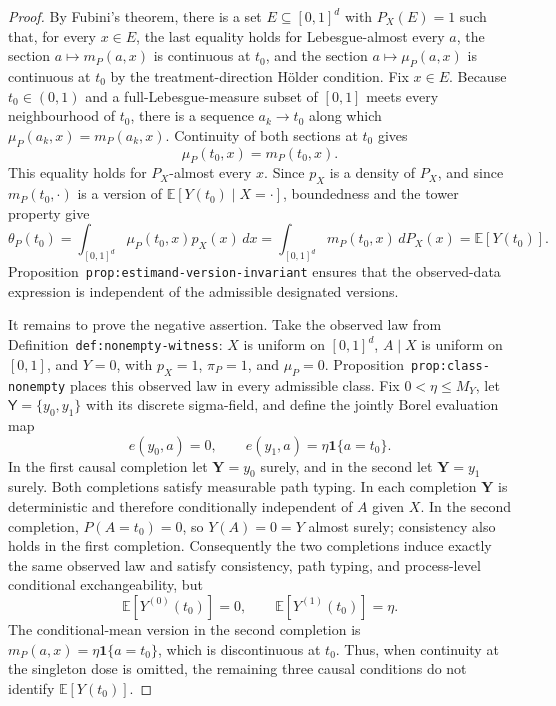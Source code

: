\documentclass{article}
\begin{document}
\begin{proof}
By Fubini's theorem, there is a set \(E\subseteq[0,1]^d\) with \(P_X(E)=1\) such that, for every \(x\in E\), the last equality holds for Lebesgue-almost every \(a\), the section \(a\mapsto m_P(a,x)\) is continuous at \(t_0\), and the section \(a\mapsto\mu_P(a,x)\) is continuous at \(t_0\) by the treatment-direction H\"older condition. Fix \(x\in E\). Because \(t_0\in(0,1)\) and a full-Lebesgue-measure subset of \([0,1]\) meets every neighbourhood of \(t_0\), there is a sequence \(a_k\to t_0\) along which \(\mu_P(a_k,x)=m_P(a_k,x)\). Continuity of both sections at \(t_0\) gives
\[
\mu_P(t_0,x)=m_P(t_0,x).
\]
This equality holds for \(P_X\)-almost every \(x\). Since \(p_X\) is a density of \(P_X\), and since \(m_P(t_0,\cdot)\) is a version of \(\mathbb E[Y(t_0)\mid X=\cdot]\), boundedness and the tower property give
\[
\theta_P(t_0)
=
\int_{[0,1]^d}\mu_P(t_0,x)p_X(x)\,dx
=
\int_{[0,1]^d}m_P(t_0,x)\,dP_X(x)
=
\mathbb E[Y(t_0)].
\]
Proposition~\texttt{prop:estimand-version-invariant} ensures that the observed-data expression is independent of the admissible designated versions.

It remains to prove the negative assertion. Take the observed law from Definition~\texttt{def:nonempty-witness}: \(X\) is uniform on \([0,1]^d\), \(A\mid X\) is uniform on \([0,1]\), and \(Y=0\), with \(p_X=1\), \(\pi_P=1\), and \(\mu_P=0\). Proposition~\texttt{prop:class-nonempty} places this observed law in every admissible class. Fix \(0<\eta\le M_Y\), let \(\mathsf Y=\{y_0,y_1\}\) with its discrete sigma-field, and define the jointly Borel evaluation map
\[
e(y_0,a)=0,
\qquad
e(y_1,a)=\eta\mathbf 1\{a=t_0\}.
\]
In the first causal completion let \(\mathbf Y=y_0\) surely, and in the second let \(\mathbf Y=y_1\) surely. Both completions satisfy measurable path typing. In each completion \(\mathbf Y\) is deterministic and therefore conditionally independent of \(A\) given \(X\). In the second completion, \(P(A=t_0)=0\), so \(Y(A)=0=Y\) almost surely; consistency also holds in the first completion. Consequently the two completions induce exactly the same observed law and satisfy consistency, path typing, and process-level conditional exchangeability, but
\[
\mathbb E[Y^{(0)}(t_0)]=0,
\qquad
\mathbb E[Y^{(1)}(t_0)]=\eta.
\]
The conditional-mean version in the second completion is \(m_P(a,x)=\eta\mathbf 1\{a=t_0\}\), which is discontinuous at \(t_0\). Thus, when continuity at the singleton dose is omitted, the remaining three causal conditions do not identify \(\mathbb E[Y(t_0)]\).
\end{proof}
\end{document}
